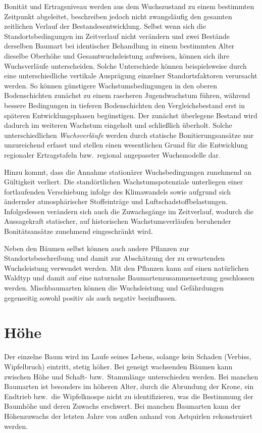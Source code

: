 \documentclass[twocolumn, paper=a4, fontsize=10pt]{scrartcl}
\begin{document}
Bonität und Ertragsniveau werden aus dem Wuchszustand zu einem bestimmten Zeitpunkt abgeleitet, beschreiben jedoch nicht zwangsläufig den gesamten zeitlichen Verlauf der Bestandesentwicklung. Selbst wenn sich die Standortsbedingungen im Zeitverlauf nicht verändern und zwei Bestände derselben Baumart bei identischer Behandlung in einem bestimmten Alter dieselbe Oberhöhe und Gesamtwuchsleistung aufweisen, können sich ihre Wuchsverläufe unterscheiden. Solche Unterschiede können beispielsweise durch eine unterschiedliche vertikale Ausprägung einzelner Standortsfaktoren verursacht werden. So können günstigere Wachstumsbedingungen in den oberen Bodenschichten zunächst zu einem rascheren Jugendwachstum führen, während bessere Bedingungen in tieferen Bodenschichten den Vergleichsbestand erst in späteren Entwicklungsphasen begünstigen. Der zunächst überlegene Bestand wird dadurch im weiteren Wachstum eingeholt und schließlich überholt. Solche unterschiedlichen \emph{Wuchsverläufe} werden durch statische Bonitierungsansätze nur unzureichend erfasst und stellen einen wesentlichen Grund für die Entwicklung regionaler Ertragstafeln bzw.\ regional angepasster Wuchsmodelle dar.

Hinzu kommt, dass die Annahme stationärer Wuchsbedingungen zunehmend an Gültigkeit verliert. Die standörtlichen Wachstumspotenziale unterliegen einer fortlaufenden Verschiebung infolge des Klimawandels sowie aufgrund sich ändernder atmosphärischer Stoffeinträge und Luftschadstoffbelastungen. Infolgedessen verändern sich auch die Zuwachsgänge im Zeitverlauf, wodurch die Aussagekraft statischer, auf historischen Wachstumsverläufen beruhender Bonitätsansätze zunehmend eingeschränkt wird.

Neben den Bäumen selbst können auch andere Pflanzen zur Standortsbeschreibung und damit zur Abschätzung der zu erwartenden Wuchsleistung verwendet werden. Mit den Pflanzen kann auf einen natürlichen Waldtyp und damit auf eine naturnahe Baumartenzusammensetzung geschlossen werden. Mischbaumarten können die Wuchsleistung und Gefährdungen gegenseitig sowohl positiv als auch negativ beeinflussen.


\section{Höhe}

Der einzelne Baum wird im Laufe seines Lebens, solange kein Schaden (Verbiss, Wipfelbruch) eintritt, stetig höher. Bei geneigt wachsenden Bäumen kann zwischen Höhe und Schaft- bzw.\ Stammlänge unterschieden werden. Bei manchen Baumarten ist besonders im höheren Alter, durch die Abrundung der Krone, ein Endtrieb bzw.\ die Wipfelknospe nicht zu identifizieren, was die Bestimmung der Baumhöhe und deren Zuwachs erschwert. Bei manchen Baumarten kann der Höhenzuwachs der letzten Jahre von außen anhand von Astquirlen rekonstruiert werden.
\end{document}
